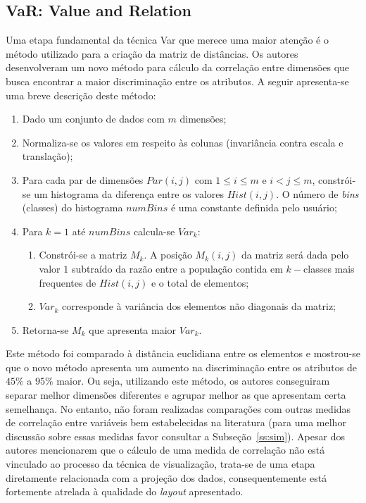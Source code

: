 
\subsection{VaR: Value and Relation}\label{sec:var}

Uma etapa fundamental da técnica Var que merece uma maior atenção é o método utilizado para a criação da matriz de distâncias. Os autores desenvolveram um novo método para cálculo da correlação entre dimensões que busca encontrar a maior discriminação entre os atributos. A seguir apresenta-se uma breve  descrição deste método:

\begin{enumerate}
   
    \item Dado um conjunto de dados com $m$ dimensões; 
    \item Normaliza-se os valores em respeito às colunas (invariância contra escala e translação);
    \item Para cada par de dimensões $Par(i,j)$ com $1 \leq i \leq m$ e $i < j \leq m$, constrói-se um histograma da diferença entre os valores $Hist(i,j)$. O número de \emph{bins} (classes) do histograma $numBins$ é uma constante definida pelo usuário;
    \item Para $k = 1$ até $numBins$ calcula-se $Var_k$:
    \begin{enumerate}
        \item Constrói-se a matriz $M_k$. A posição $M_k(i,j)$ da matriz será dada pelo valor $1$ subtraído da razão entre a população contida em $k-$classes mais frequentes de $Hist(i,j)$ e o total de elementos;
        \item $Var_k$ corresponde à variância dos elementos não diagonais da matriz;
    \end{enumerate}
\item Retorna-se $M_k$ que apresenta maior $Var_k$.

\end{enumerate}

Este método foi comparado à distância euclidiana entre os elementos e mostrou-se que o novo método apresenta um aumento na discriminação entre os atributos de $45\%$ a $95\%$ maior. Ou seja, utilizando este método, os autores conseguiram separar melhor dimensões diferentes e agrupar melhor as que apresentam certa semelhança. No entanto, não foram realizadas comparações com outras medidas de correlação entre variáveis bem estabelecidas na  literatura (para uma melhor discussão sobre essas medidas favor consultar a Subseção~\ref{ss:sim}). Apesar dos autores mencionarem que o cálculo de uma medida de correlação não está vinculado ao processo da técnica de visualização, trata-se de uma etapa diretamente relacionada com a projeção dos dados, consequentemente está fortemente atrelada à qualidade do \emph{layout} apresentado.

